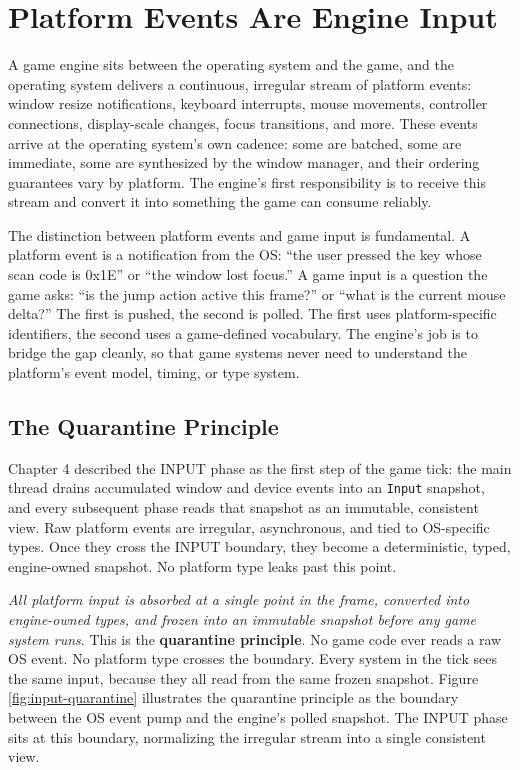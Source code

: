 \documentclass[
  11pt,
  letterpaper,
  DIV=11,
  numbers=noendperiod,
  twoside,
  open=right]{scrreprt}
\begin{document}
\section{Platform Events Are Engine Input}\label{sec-platform-events}

A game engine sits between the operating system and the game, and the
operating system delivers a continuous, irregular stream of platform
events: window resize notifications, keyboard interrupts, mouse
movements, controller connections, display-scale changes, focus
transitions, and more. These events arrive at the operating system's own
cadence: some are batched, some are immediate, some are synthesized by
the window manager, and their ordering guarantees vary by platform. The
engine's first responsibility is to receive this stream and convert it
into something the game can consume reliably.

The distinction between platform events and game input is fundamental. A
platform event is a notification from the OS: ``the user pressed the key
whose scan code is 0x1E'' or ``the window lost focus.'' A game input is
a question the game asks: ``is the jump action active this frame?'' or
``what is the current mouse delta?'' The first is pushed, the second is
polled. The first uses platform-specific identifiers, the second uses a
game-defined vocabulary. The engine's job is to bridge the gap cleanly,
so that game systems never need to understand the platform's event
model, timing, or type system.

\subsection{The Quarantine Principle}\label{the-quarantine-principle}

Chapter 4 described the INPUT phase as the first step of the game tick:
the main thread drains accumulated window and device events into an
\texttt{Input} snapshot, and every subsequent phase reads that snapshot
as an immutable, consistent view. Raw platform events are irregular,
asynchronous, and tied to OS-specific types. Once they cross the INPUT
boundary, they become a deterministic, typed, engine-owned snapshot. No
platform type leaks past this point.

\emph{All platform input is absorbed at a single point in the frame,
converted into engine-owned types, and frozen into an immutable snapshot
before any game system runs}. This is the \textbf{quarantine principle}.
No game code ever reads a raw OS event. No platform type crosses the
boundary. Every system in the tick sees the same input, because they all
read from the same frozen snapshot. Figure \ref{fig:input-quarantine}
illustrates the quarantine principle as the boundary between the OS
event pump and the engine's polled snapshot. The INPUT phase sits at
this boundary, normalizing the irregular stream into a single consistent
view.
\end{document}
